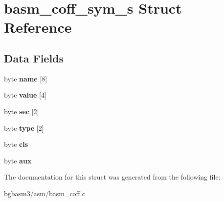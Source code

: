 \hypertarget{structbasm__coff__sym__s}{\section{basm\-\_\-coff\-\_\-sym\-\_\-s Struct Reference}
\label{structbasm__coff__sym__s}
}
\subsection*{Data Fields}
\begin{DoxyCompactItemize}
\item 
\hypertarget{structbasm__coff__sym__s_ab90911169221d66f1f3cd38e3e6d4ea5}{byte {\bfseries name} \mbox{[}8\mbox{]}}\label{structbasm__coff__sym__s_ab90911169221d66f1f3cd38e3e6d4ea5}

\item 
\hypertarget{structbasm__coff__sym__s_a12ea59068d671d7c1479ebc91d959077}{byte {\bfseries value} \mbox{[}4\mbox{]}}\label{structbasm__coff__sym__s_a12ea59068d671d7c1479ebc91d959077}

\item 
\hypertarget{structbasm__coff__sym__s_a500490e9f5f9d8310997045af0b3e3da}{byte {\bfseries sec} \mbox{[}2\mbox{]}}\label{structbasm__coff__sym__s_a500490e9f5f9d8310997045af0b3e3da}

\item 
\hypertarget{structbasm__coff__sym__s_ae7602d949ad0bc3d2829720fdc80cc1c}{byte {\bfseries type} \mbox{[}2\mbox{]}}\label{structbasm__coff__sym__s_ae7602d949ad0bc3d2829720fdc80cc1c}

\item 
\hypertarget{structbasm__coff__sym__s_a6a40683664139a5ce7e1e0214d3f2796}{byte {\bfseries cls}}\label{structbasm__coff__sym__s_a6a40683664139a5ce7e1e0214d3f2796}

\item 
\hypertarget{structbasm__coff__sym__s_a228854055bc81e99904a05b79d97473d}{byte {\bfseries aux}}\label{structbasm__coff__sym__s_a228854055bc81e99904a05b79d97473d}

\end{DoxyCompactItemize}


The documentation for this struct was generated from the following file\-:\begin{DoxyCompactItemize}
\item 
bgbasm3/asm/basm\-\_\-coff.\-c\end{DoxyCompactItemize}
